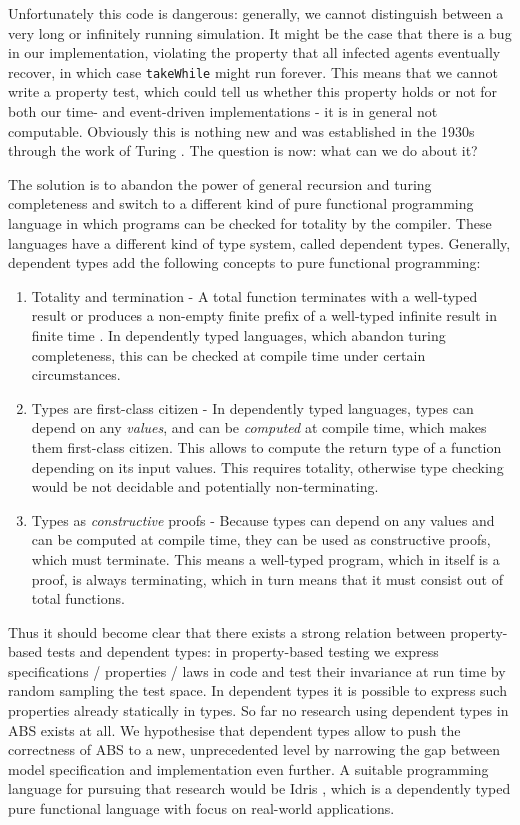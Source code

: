 Unfortunately this code is dangerous: generally, we cannot distinguish between a very long or infinitely running simulation. It might be the case that there is a bug in our implementation, violating the property that all infected agents eventually recover, in which case \texttt{takeWhile} might run forever. This means that we cannot write a property test, which could tell us whether this property holds or not for both our time- and event-driven implementations - it is in general not computable. Obviously this is nothing new and was established in the 1930s through the work of Turing \cite{turing_computable_1937}. The question is now: what can we do about it?

The solution is to abandon the power of general recursion and turing completeness and switch to a different kind of pure functional programming language in which programs can be checked for totality by the compiler. These languages have a different kind of type system, called dependent types. Generally, dependent types add the following concepts to pure functional programming:

\begin{enumerate}
	\item Totality and termination - A total function terminates with a well-typed result or produces a non-empty finite prefix of a well-typed infinite result in finite time \cite{brady_type-driven_2017}. In dependently typed languages, which abandon turing completeness, this can be checked at compile time under certain circumstances.
	
	\item Types are first-class citizen - In dependently typed languages, types can depend on any \textit{values}, and can be \textit{computed} at compile time, which makes them first-class citizen. This allows to compute the return type of a function depending on its input values. This requires totality, otherwise type checking would be not decidable and potentially non-terminating.
	
	\item Types as \textit{constructive} proofs - Because types can depend on any values and can be computed at compile time, they can be used as constructive proofs, which must terminate. This means a well-typed program, which in itself is a proof, is always terminating, which in turn means that it must consist out of total functions.
\end{enumerate}

Thus it should become clear that there exists a strong relation between property-based tests and dependent types: in property-based testing we express specifications / properties / laws in code and test their invariance at run time by random sampling the test space. In dependent types it is possible to express such properties already statically in types. So far no research using dependent types in ABS exists at all. We hypothesise that dependent types allow to push the correctness of ABS to a new, unprecedented level by narrowing the gap between model specification and implementation even further. A suitable programming language for pursuing that research would be Idris \cite{brady_idris_2013}, which is a dependently typed pure functional language with focus on real-world applications.

